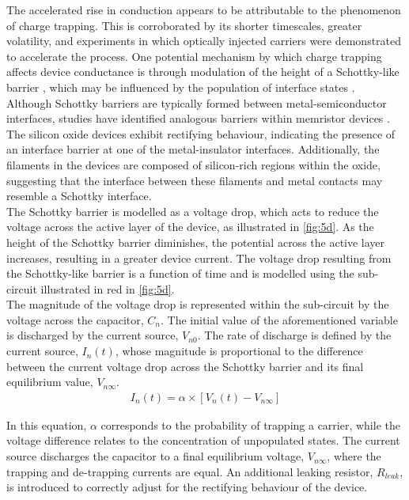 \noindent The accelerated rise in conduction appears to be attributable to the phenomenon of charge trapping. This is corroborated by its shorter timescales, greater volatility, and experiments in which optically injected carriers were demonstrated to accelerate the process. One potential mechanism by which charge trapping affects device conductance is through modulation of the height of a Schottky-like barrier \cite{cowley1965surface}, which may be influenced by the population of interface states \cite{sze2021physics}. \\

\noindent Although Schottky barriers are typically formed between metal-semiconductor interfaces, studies have identified analogous barriers within memristor devices \cite{hansen2015double}. The silicon oxide devices exhibit rectifying behaviour, indicating the presence of an interface barrier at one of the metal-insulator interfaces. Additionally, the filaments in the devices are composed of silicon-rich regions within the oxide, suggesting that the interface between these filaments and metal contacts may resemble a Schottky interface.\\

\noindent The Schottky barrier is modelled as a voltage drop, which acts to reduce the voltage across the active layer of the device, as illustrated in \ref{fig:5d}. As the height of the Schottky barrier diminishes, the potential across the active layer increases, resulting in a greater device current. The voltage drop resulting from the Schottky-like barrier is a function of time and is modelled using the sub-circuit illustrated in red in \ref{fig:5d}. \\

\noindent The magnitude of the voltage drop is represented within the sub-circuit by the voltage across the capacitor, $C_n$. The initial value of the aforementioned variable is discharged by the current source, $V_{n0}$. The rate of discharge is defined by the current source, $I_n(t)$, whose magnitude is proportional to the difference between the current voltage drop across the Schottky barrier and its final equilibrium value, $V_{n\infty}$.
\begin{align}
I_n(t) = \alpha \times \left[ V_n(t) - V_{n\infty} \right] \label{eq:5.5} 
\end{align}

\noindent In this equation, $\alpha$ corresponds to the probability of trapping a carrier, while the voltage difference relates to the concentration of unpopulated states. The current source discharges the capacitor to a final equilibrium voltage, $V_{n\infty}$, where the trapping and de-trapping currents are equal. An additional leaking resistor, $R_{leak}$, is introduced to correctly adjust for the rectifying behaviour of the device.\\

